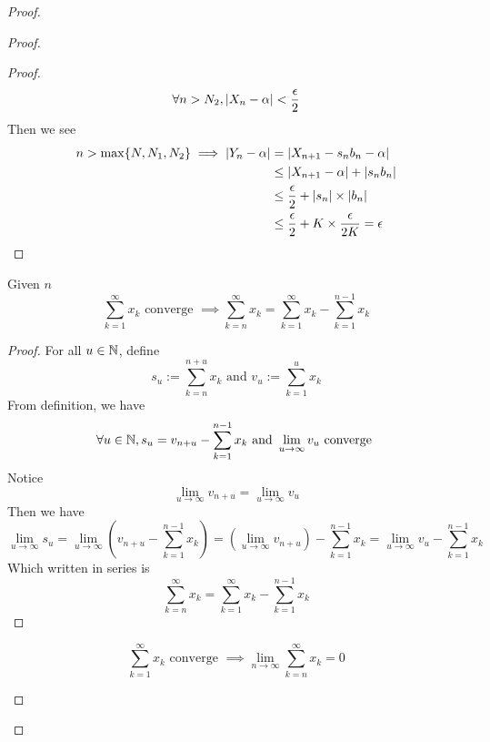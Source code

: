 \documentclass{report}
\begin{document}
\begin{proof}
\begin{proof}
\begin{proof}
\begin{equation}
\forall n>N_2, \left|X_n-\alpha \right|<\frac{\epsilon }{2}
\end{equation}
Then we see
\begin{align}
  n>\max \{ N,N_1,N_2 \}\implies \left|Y_n-\alpha \right|&=\left|X_{n+1}-s_nb_n-\alpha \right|\\
&\leq \left|X_{n+1}-\alpha \right|+\left|s_nb_n\right|\\
&\leq \frac{\epsilon}{2}+\left|s_n\right|\times \left|b_n\right|\\
&\leq \frac{\epsilon}{2}+K\times \frac{\epsilon }{2K}=\epsilon 
\end{align}





\end{proof}
\begin{lemma}
\label{3.4.1}
Given $n$
\begin{equation}
  \sum_{k=1}^\infty x_k\text{ converge }\implies \sum_{k=n}^\infty x_k=\sum_{k=1}^\infty x_k-\sum_{k=1}^{n-1}x_k
\end{equation}
\end{lemma}
\begin{proof}
For all $u\in\mathbb{N}$, define 
\begin{equation}
s_u:=\sum_{k=n}^{n+u}x_k\text{ and }v_u:=\sum_{k=1}^{u}x_k
\end{equation}
From definition, we have
\begin{equation}
  \forall u\in\mathbb{N},s_u=v_{n+u}-\sum_{k=1}^{n-1}x_k\text{ and }\lim_{u\to\infty}v_u\text{ converge }
\end{equation}
Notice 
\begin{equation}
\lim_{u\to\infty}v_{n+u}=\lim_{u\to\infty}v_u
\end{equation}
Then we have
\begin{equation}
\lim_{u\to\infty}s_u=\lim_{u\to\infty} (v_{n+u}-\sum_{k=1}^{n-1}x_k)=(\lim_{u\to\infty}v_{n+u})-\sum_{k=1}^{n-1}x_k=\lim_{u\to\infty}v_u-\sum_{k=1}^{n-1}x_k
\end{equation}
Which written in series is
\begin{equation}
\sum_{k=n}^{\infty} x_k=\sum_{k=1}^\infty x_k-\sum_{k=1}^{n-1}x_k
\end{equation}
\end{proof}
\begin{lemma}
\label{3.4.2}
\begin{equation}
\sum_{k=1}^\infty x_k\text{ converge }\implies \lim_{n\to\infty}\sum_{k=n}^\infty x_k=0
\end{equation}
\end{lemma}

\end{proof}
\end{proof}
\end{document}
